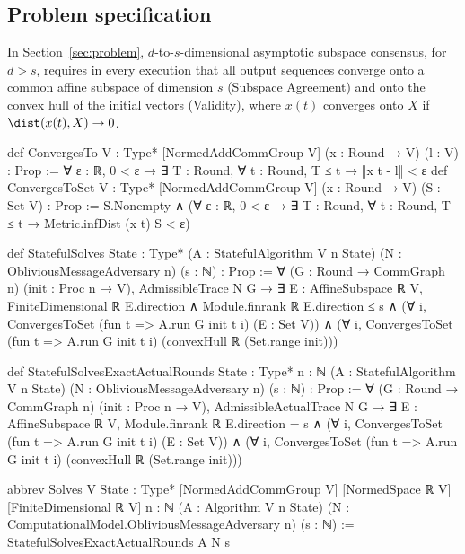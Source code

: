 \subsection{Problem specification}\label{app:lean-problem}

In Section~\ref{sec:problem}, $d$-to-$s$-dimensional asymptotic subspace consensus, for $d>s$, requires in every execution that all output sequences converge onto a common affine subspace of dimension $s$ (Subspace Agreement) and onto the convex hull of the initial vectors (Validity), where $x(t)$ converges onto $X$ if $\dist(x(t),X)\to0$.

\begin{leanlisting}
\begin{leancode}
def ConvergesTo {V : Type*} [NormedAddCommGroup V] (x : Round → V) (l : V) : Prop :=
  ∀ ε : ℝ, 0 < ε → ∃ T : Round, ∀ t : Round, T ≤ t → ‖x t - l‖ < ε
def ConvergesToSet {V : Type*} [NormedAddCommGroup V] (x : Round → V) (S : Set V) : Prop :=
  S.Nonempty ∧
    (∀ ε : ℝ, 0 < ε → ∃ T : Round, ∀ t : Round, T ≤ t → Metric.infDist (x t) S < ε)
\end{leancode}
\begin{leancode}
def StatefulSolves {State : Type*} (A : StatefulAlgorithm V n State)
    (N : ObliviousMessageAdversary n) (s : ℕ) : Prop :=
  ∀ (G : Round → CommGraph n) (init : Proc n → V), AdmissibleTrace N G →
    ∃ E : AffineSubspace ℝ V, FiniteDimensional ℝ E.direction ∧
      Module.finrank ℝ E.direction ≤ s ∧
      (∀ i, ConvergesToSet (fun t => A.run G init t i) (E : Set V)) ∧
      (∀ i, ConvergesToSet (fun t => A.run G init t i) (convexHull ℝ (Set.range init)))
\end{leancode}
\begin{leancode}
def StatefulSolvesExactActualRounds {State : Type*} {n : ℕ}
    (A : StatefulAlgorithm V n State) (N : ObliviousMessageAdversary n) (s : ℕ) : Prop :=
  ∀ (G : Round → CommGraph n) (init : Proc n → V), AdmissibleActualTrace N G →
    ∃ E : AffineSubspace ℝ V, Module.finrank ℝ E.direction = s ∧
      (∀ i, ConvergesToSet (fun t => A.run G init t i) (E : Set V)) ∧
      (∀ i, ConvergesToSet (fun t => A.run G init t i) (convexHull ℝ (Set.range init)))
\end{leancode}
\begin{leancode}
abbrev Solves {V State : Type*} [NormedAddCommGroup V] [NormedSpace ℝ V]
    [FiniteDimensional ℝ V] {n : ℕ} (A : Algorithm V n State)
    (N : ComputationalModel.ObliviousMessageAdversary n) (s : ℕ) :=
  StatefulSolvesExactActualRounds A N s
\end{leancode}
\end{leanlisting}

